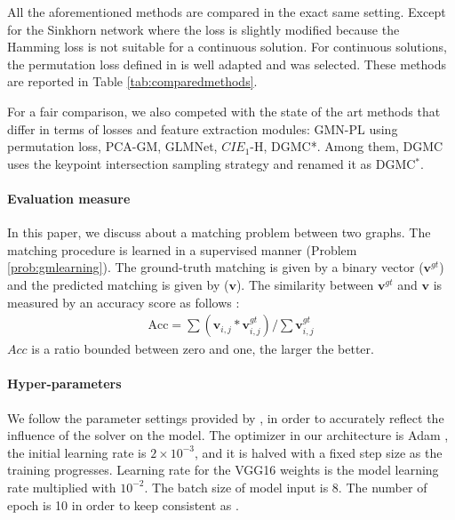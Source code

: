 \documentclass[times,onecolumn,final,authoryear]{article}
\theoremstyle{definition}
\begin{document}
All the aforementioned methods are compared in the exact same setting. Except for the Sinkhorn network \cite{SinkhornNet} where the loss is slightly modified because the Hamming loss is not suitable for a continuous solution. For continuous solutions, the permutation loss defined in \cite{PCA-GM} is well adapted and was selected. These methods are reported in Table \ref{tab:comparedmethods}.

For a fair comparison, we also competed with the state of the art methods that differ in terms of losses and feature extraction modules: GMN-PL\cite{GMN} using permutation loss, PCA-GM\cite{PCA-GM}, GLMNet\cite{GLMNet}, $CIE_1$-H\cite{CIE}, DGMC*\cite{DGMC}. Among them, DGMC\cite{DGMC} uses the keypoint intersection sampling strategy and renamed it as DGMC$^*$.



\paragraph{Evaluation measure}
In this paper, we discuss about a matching problem between two graphs. The matching procedure is learned in a supervised manner (Problem \ref{prob:gmlearning}). The ground-truth matching is given by a binary vector ($\mathbf{v}^{gt}$) and the predicted matching is given by ($\mathbf{v}$). The similarity between $\mathbf{v}^{gt}$ and $\mathbf{v}$ is measured by an accuracy score as follows : 
\begin{align}
    \label{7}
    \text{Acc} = \sum (\mathbf{v}_{i,j} * \mathbf{v}^{gt}_{i,j}) / \sum \mathbf{v}^{gt}_{i,j}
\end{align}
$Acc$ is a ratio bounded between zero and one, the larger the better. 


\paragraph{Hyper-parameters}
We follow the parameter settings provided by \cite{BB-GM}, in order to accurately reflect the influence of the solver on the model. The optimizer in our architecture is Adam \cite{da2014method}, the initial learning rate is $2\times 10^{-3}$, and it is halved with a fixed step size as the training progresses. Learning rate for the VGG16 weights is the model learning rate multiplied with $10^{-2}$. The batch size of model input is 8. The number of epoch is 10 in order to keep consistent as \cite{BB-GM}. 
\end{document}
